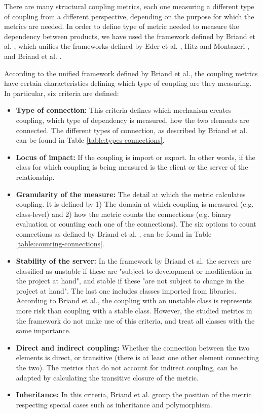 There are many structural coupling metrics, each one measuring a different type of coupling from a different perspective, depending on the purpose for which the metrics are needed. In order to define type of metric needed to measure the dependency between products, we have used the framework defined by Briand et al. \cite{briand1999unified}, which unifies the frameworks defined by Eder et al. \cite{eder1994coupling}, Hitz and Montazeri \cite{hitz1995measuring}, and Briand et al. \cite{briand1997investigation}.

According to the unified framework defined by Briand et al., the coupling metrics have certain characteristics defining which type of coupling are they measuring. In particular, six criteria are defined:

\begin{itemize}
  \item \textbf{Type of connection:} This criteria defines which mechanism creates coupling, which type of dependency is measured, how the two elements are connected. The different types of connection, as described by Briand et al. \cite{briand1999unified} can be found in Table \ref{table:types-connections}.

  \item \textbf{Locus of impact:} If the coupling is import or export. In other words, if the class for which coupling is being measured is the client or the server of the relationship.

  \item \textbf{Granularity of the measure:} The detail at which the metric calculates coupling. It is defined by 1) The domain at which coupling is measured (e.g. class-level) and 2) how the metric counts the connections (e.g. binary evaluation or counting each one of the connections). The six options to count connections as defined by Briand et al. \cite{briand1999unified}, can be found in Table \ref{table:counting-connections}.

  \item \textbf{Stability of the server:} In the framework by Briand et al. the servers are classified as unstable if these are  "subject to development or modification in the project at hand", and stable if these "are not subject to change in the project at hand". The last one includes classes imported from libraries. According to Briand et al., the coupling with an unstable class is represents more risk than coupling with a stable class. However, the studied metrics in the framework do not make use of this criteria, and treat all classes with the same importance.

  \item \textbf{Direct and indirect coupling:} Whether the connection between the two elements is direct, or transitive (there is at least one other element connecting the two). The metrics that do not account for indirect coupling, can be adapted by calculating the transitive closure of the metric.

  \item \textbf{Inheritance:} In this criteria, Briand et al. group the position of the metric respecting special cases such as inheritance and polymorphism.
\end{itemize}

